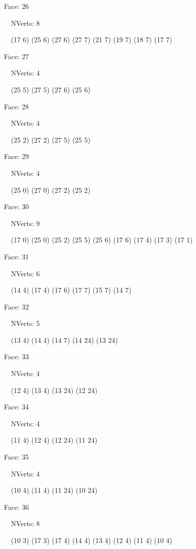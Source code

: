 \documentclass{article}
\begin{document}
{\footnotesize 

Face: 26

\   \    NVerts: 8

 \   \   (17 6) (25 6) (27 6) (27 7) (21 7) (19 7) (18 7) (17 7)}

{\footnotesize 

Face: 27

\   \    NVerts: 4

 \   \   (25 5) (27 5) (27 6) (25 6)}

{\footnotesize 

Face: 28

\   \    NVerts: 4

 \   \   (25 2) (27 2) (27 5) (25 5)}

{\footnotesize 

Face: 29

\   \    NVerts: 4

 \   \   (25 0) (27 0) (27 2) (25 2)}

{\footnotesize 

Face: 30

\   \    NVerts: 9

 \   \   (17 0) (25 0) (25 2) (25 5) (25 6) (17 6) (17 4) (17 3) (17 1)}

{\footnotesize 

Face: 31

\   \    NVerts: 6

 \   \   (14 4) (17 4) (17 6) (17 7) (15 7) (14 7)}

{\footnotesize 

Face: 32

\   \    NVerts: 5

 \   \   (13 4) (14 4) (14 7) (14 24) (13 24)}

{\footnotesize 

Face: 33

\   \    NVerts: 4

 \   \   (12 4) (13 4) (13 24) (12 24)}

{\footnotesize 

Face: 34

\   \    NVerts: 4

 \   \   (11 4) (12 4) (12 24) (11 24)}

{\footnotesize 

Face: 35

\   \    NVerts: 4

 \   \   (10 4) (11 4) (11 24) (10 24)}

{\footnotesize 

Face: 36

\   \    NVerts: 8

 \   \   (10 3) (17 3) (17 4) (14 4) (13 4) (12 4) (11 4) (10 4)}
\end{document}
